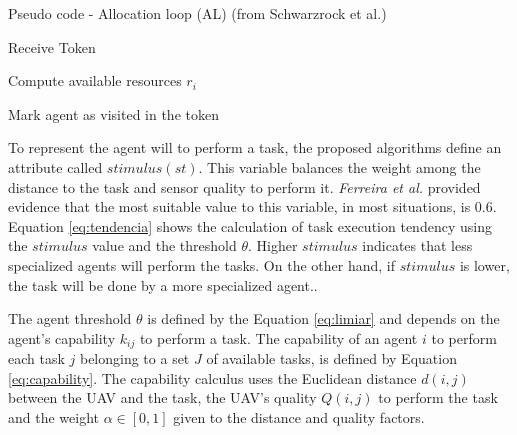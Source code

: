 \begin{algorithm}[h!t]
	\caption{Pseudo code - Allocation loop (AL) (from Schwarzrock et al.\cite{MAS07})}
	\label{algo:swarm-gap}
	
	\SetAlgoLined
	\DontPrintSemicolon
	\SetNlSkip{0.3em}
	
	Receive Token\; \label{line:recebe}
	
	Compute available resources $r_i $ \; \label{line:compute_r}
	
	Mark agent as visited in the token\; \label{line:ALini}
\end{algorithm}

To represent the agent will to perform a task, the proposed algorithms define an attribute called $stimulus (st)$. This variable balances the weight among the distance to the task and sensor quality to perform it. \textit{Ferreira et al.}\cite{ferreira2007swarm} provided evidence that the most suitable value to this variable, in most situations, is $0.6$. Equation \ref{eq:tendencia} shows the calculation of task execution tendency using the $stimulus$ value and the threshold $\theta$. Higher $stimulus$ indicates that less specialized agents will perform the tasks. On the other hand, if $stimulus$ is lower, the task will be done by a more specialized agent.\cite{bonabeau1999swarm}. 

The agent threshold $\theta$ is defined by the Equation \ref{eq:limiar} and depends on the agent's capability $k_{ij}$ to perform a task. The capability of an agent $i$ to perform each task $j$ belonging to a set $J$ of available tasks, is defined by Equation \ref{eq:capability}. The capability calculus uses the Euclidean distance $d(i,j)$ between the UAV and the task, the UAV's quality $Q(i,j)$ to perform the task and the weight $\alpha \in [0,1]$ given to the distance and quality factors. 

